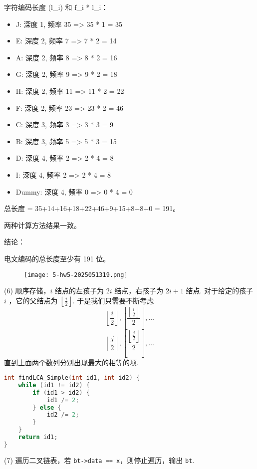 字符编码长度 (l\_i) 和 f\_i * l\_i：

\begin{itemize}
	\item J: 深度 1, 频率 35 => 35 * 1 = 35
	\item E: 深度 2, 频率 7 => 7 * 2 = 14
	\item A: 深度 2, 频率 8 => 8 * 2 = 16
	\item G: 深度 2, 频率 9 => 9 * 2 = 18
	\item H: 深度 2, 频率 11 => 11 * 2 = 22
	\item F: 深度 2, 频率 23 => 23 * 2 = 46
	\item C: 深度 3, 频率 3 => 3 * 3 = 9
	\item B: 深度 3, 频率 5 => 5 * 3 = 15
	\item D: 深度 4, 频率 2 => 2 * 4 = 8
	\item I: 深度 4, 频率 2 => 2 * 4 = 8
	\item Dummy: 深度 4, 频率 0 => 0 * 4 = 0
\end{itemize}

总长度 = 35+14+16+18+22+46+9+15+8+8+0 = 191。

两种计算方法结果一致。

结论：

电文编码的总长度至少有 191 位。

\begin{figure}[H]
\centering
\texttt{[image: 5-hw5-2025051319.png]}
\label{}
\end{figure}

(6)
顺序存储，$i$ 结点的左孩子为 $2i$ 结点，右孩子为 $2i+1$ 结点. 对于给定的孩子 $i$ ，它的父结点为 $\left\lfloor  \frac{i}{2}  \right\rfloor$. 于是我们只需要不断考虑
\[
\left\lfloor  \frac{i}{2}  \right\rfloor ,\left\lfloor  \frac{\left\lfloor  \frac{i}{2}  \right\rfloor}{2}   \right\rfloor ,\dots
\]
\[
\left\lfloor  \frac{j}{2}  \right\rfloor ,\left\lfloor  \frac{\left\lfloor  \frac{j}{2}  \right\rfloor}{2}   \right\rfloor ,\dots
\]
直到上面两个数列分别出现最大的相等的项.

\begin{lstlisting}[language=C++]
int findLCA_Simple(int id1, int id2) {
    while (id1 != id2) {
        if (id1 > id2) {
            id1 /= 2;
        } else {
            id2 /= 2;
        }
    }
    return id1;
}
\end{lstlisting}
(7)
遍历二叉链表，若 \lstinline{bt->data == x}，则停止遍历，输出 \lstinline{bt}.

